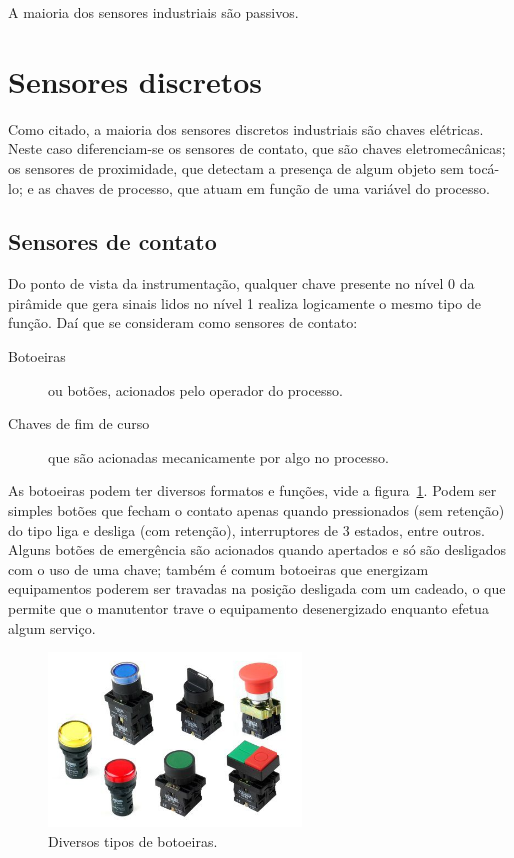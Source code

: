 A maioria dos sensores industriais são passivos.

\section{Sensores discretos}

Como citado, a maioria dos sensores discretos industriais são chaves elétricas. Neste caso diferenciam-se os sensores de contato, que são chaves eletromecânicas; os sensores de proximidade, que detectam a presença de algum objeto sem tocá-lo; e as chaves de processo, que atuam em função de uma variável do processo.

\subsection{Sensores de contato}
Do ponto de vista da instrumentação, qualquer chave presente no nível 0 da pirâmide que gera sinais lidos no nível 1 realiza logicamente o mesmo tipo de função. Daí que se consideram como sensores de contato:
\begin{description}
  \item[Botoeiras] ou botões, acionados pelo operador do processo.
  \item[Chaves de fim de curso] que são acionadas mecanicamente por algo no processo.
\end{description}

As botoeiras podem ter diversos formatos e funções, vide a figura~\ref{fig:botoeiras}. Podem ser simples botões que fecham o contato apenas quando pressionados (sem retenção) do tipo liga e desliga (com retenção), interruptores de 3 estados, entre outros. Alguns botões de emergência são acionados quando apertados e só são desligados com o uso de uma chave; também é comum botoeiras que energizam equipamentos poderem ser travadas na posição desligada com um cadeado, o que permite que o manutentor trave o equipamento desenergizado enquanto efetua algum serviço.

\begin{figure}
  \centering
  \includegraphics[width=0.6\textwidth]{figuras/botoeiras}
  \caption{Diversos tipos de botoeiras.}\label{fig:botoeiras}
\end{figure}

